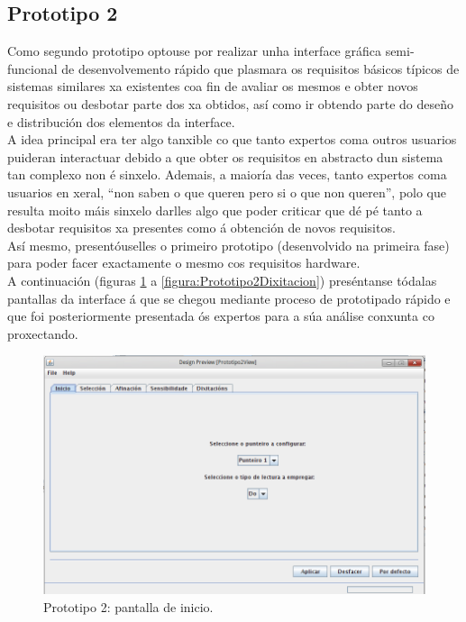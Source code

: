  \subsection{Prototipo 2}

 Como segundo prototipo optouse por realizar unha interface gráfica
 semi-funcional de desenvolvemento rápido que plasmara os requisitos básicos
 típicos de sistemas similares xa existentes coa fin de avaliar os mesmos e
 obter novos requisitos ou desbotar parte dos xa obtidos, así como ir obtendo
 parte do deseño e distribución dos elementos da interface. \\

 A idea principal era ter algo tanxible co que tanto expertos coma outros
 usuarios puideran interactuar debido a que obter os requisitos en abstracto
 dun sistema tan complexo non é sinxelo. Ademais, a maioría das veces, tanto
 expertos coma usuarios en xeral, “non saben o que queren pero si o que non
 queren”, polo que resulta moito máis sinxelo darlles algo que poder criticar
 que dé pé tanto a desbotar requisitos xa presentes como á obtención de novos
 requisitos. \\

 Así mesmo, presentóuselles o primeiro prototipo (desenvolvido na primeira
 fase) para poder facer exactamente o mesmo cos requisitos hardware. \\

 A continuación (figuras \ref{figura:Prototipo2Inicio} a
 \ref{figura:Prototipo2Dixitacion}) preséntanse tódalas pantallas da interface
 á que se chegou mediante proceso de prototipado rápido e que foi
 posteriormente presentada ós expertos para a súa análise conxunta co
 proxectando. \\

 \begin{figure}[htbp]
  \centering
  \includegraphics[scale=0.6,keepaspectratio=true]{./imagenes/prototipo2_01.png}
  \caption{Prototipo 2: pantalla de inicio.}
  \label{figura:Prototipo2Inicio}
 \end{figure}

